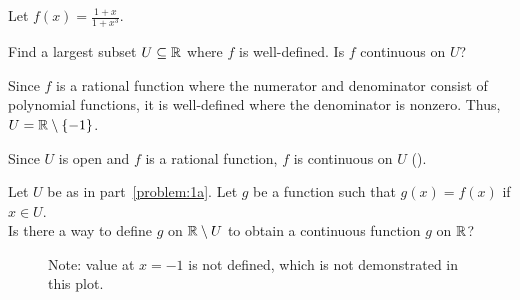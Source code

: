 \begin{problem}
  Let $\displaystyle f(x) = \frac{1 + x}{1 + x^3}$.
  \begin{enumroman}
    \item Find a largest subset $U \subseteq \mathbb{R}$ where $f$ is well-defined.
      Is $f$ continuous on $U$?~\label{problem:1a}
      
      \begin{answer}
        Since $f$ is a rational function where the numerator and
        denominator consist of polynomial functions,
        it is well-defined where the denominator is nonzero.
        Thus, $U = \mathbb{R} \setminus \{-1\}$.

        \step
        Since $U$ is open and $f$ is a rational function, $f$ is continuous
        on $U$ ().
      \end{answer}

    \newpage
    \item Let $U$ be as in part~\ref{problem:1a}.
      Let $g$ be a function such that $g(x) = f(x)$ if $x \in U$. \\
      Is there a way to define $g$ on $\mathbb{R} \setminus U$ to obtain
      a continuous function $g$ on $\mathbb{R}$?~\label{problem:1b}

      \begin{answer}
        \begin{figure}[H]
          \caption*{Note: value at $x = -1$ is not defined, which is not demonstrated in this plot.}
        \end{figure}


\end{answer}
\end{enumroman}
\end{problem}

